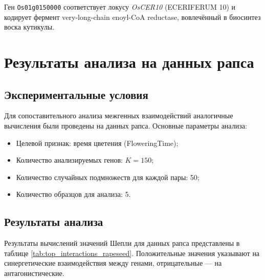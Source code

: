 Ген \texttt{Os01g0150000} соответствует локусу \textit{OsCER10} (ECERIFERUM 10) и кодирует фермент very-long-chain enoyl-CoA reductase, вовлечённый в биосинтез воска кутикулы.

\section{Результаты анализа на данных рапса}
\label{sec:rapeseed_shapley}

\subsection{Экспериментальные условия}

Для сопоставительного анализа межгенных взаимодействий аналогичные 
вычисления были проведены на данных рапса. Основные параметры анализа:
\begin{itemize}
	\item Целевой признак: время цветения (FloweringTime);
	\item Количество анализируемых генов: $K = 150$;
	\item Количество случайных подмножеств для каждой пары: 50;
	\item Количество образцов для анализа: 5.
\end{itemize}

\subsection{Результаты анализа}

Результаты вычислений значений Шепли для данных рапса представлены в 
таблице \ref{tab:top_interactions_rapeseed}. Положительные значения 
указывают на синергетические взаимодействия между генами, отрицательные 
— на антагонистические.

